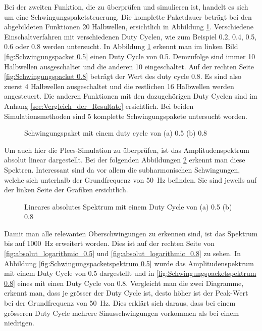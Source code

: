 Bei der zweiten Funktion, die zu überprüfen und simulieren ist, handelt es sich um eine Schwingungspaketsteuerung. Die komplette Paketdauer beträgt bei den abgebildeten Funktionen 20 Halbwellen, ersichtlich in Abbildung \ref{fig:Schwingungspaket Matlab}. Verschiedene Einschaltverfahren mit verschiedenen Duty Cyclen, wie zum Beispiel 0.2, 0.4, 0.5, 0.6 oder 0.8 werden untersucht. In Abbildung \ref{fig:Schwingungspaket Matlab} erkennt man im linken Bild \ref{fig:Schwingungspacket 0.5} einen Duty Cycle von 0.5. Demzufolge sind immer 10 Halbwellen ausgeschaltet und die anderen 10 eingeschaltet.
Auf der rechten Seite \ref{fig:Schwingungspacket 0.8} beträgt der Wert des duty cycle 0.8. Es sind also zuerst 4 Halbwellen ausgeschaltet und die restlichen 16 Halbwellen werden angesteuert. Die anderen Funktionen mit den dazugehörigen Duty Cyclen sind im Anhang \ref{sec:Vergleich_der_Resultate} ersichtlich. Bei beiden Simulationsmethoden sind 5 komplette Schwingungspakete untersucht worden. 

\begin{figure}[ht!]
	\centering
	\qquad
	\caption{Schwingungspaket mit einem duty cycle von (a) 0.5 (b) 0.8}
	\label{fig:Schwingungspaket Matlab}
\end{figure} 

Um auch hier die Plecs-Simulation zu überprüfen, ist das Amplitudenspektrum absolut linear dargestellt. Bei der folgenden Abbildungen \ref{fig:Schwingungspaketspektrum Matlab} erkennt man diese Spektren. Interessant sind da vor allem die subharmonischen Schwingungen, welche sich unterhalb der Grundfrequenz von \SI{50}{Hz} befinden. Sie sind jeweils auf der linken Seite der Grafiken ersichtlich.   

\begin{figure}[ht!]
	\centering
	\qquad
	\caption{Lineares absolutes Spektrum mit einem Duty Cycle von (a) 0.5 (b) 0.8}
	\label{fig:Schwingungspaketspektrum Matlab}
\end{figure}


Damit man alle relevanten Oberschwingungen zu erkennen sind, ist das Spektrum bis auf \SI{1000}{Hz} erweitert worden. Dies ist auf der rechten Seite von \ref{fig:absolut_logarithmic_0.5} und \ref{fig:absolut_logarithmic_0.8} zu sehen. In Abbildung \ref{fig:Schwingungspacketspektrum 0.5} wurde das Amplitudenspektrum mit einem Duty Cycle von 0.5 dargestellt und in \ref{fig:Schwingungspacketspektrum 0.8} eines mit einen Duty Cycle von 0.8. Vergleicht man die zwei Diagramme, erkennt man, dass je grösser der Duty Cycle ist, desto höher ist der Peak-Wert bei der Grundfrequenz von \SI{50}{Hz}. Dies erklärt sich daraus, dass bei einem grösseren Duty Cycle mehrere Sinusschwingungen vorkommen als bei einem niedrigen.\\


